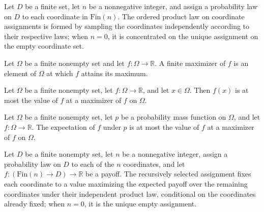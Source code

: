 \begin{definition}
\label{FABL.orderedProductPMF}
\leanok
Let $D$ be a finite set, let $n$ be a nonnegative integer, and assign a probability law
on $D$ to each coordinate in $\mathrm{Fin}(n)$. The ordered product law on coordinate
assignments is formed by sampling the coordinates independently according to their
respective laws; when $n=0$, it is concentrated on the unique assignment on the empty
coordinate set.
\end{definition}

\begin{definition}
\label{FABL.finiteMaximizer}
\leanok
Let $\Omega$ be a finite nonempty set and let $f:\Omega\to\mathbb R$. A finite maximizer
of $f$ is an element of $\Omega$ at which $f$ attains its maximum.
\end{definition}

\begin{theorem}
\label{FABL.le_finiteMaximizer}
\leanok
{}
Let $\Omega$ be a finite nonempty set, let $f:\Omega\to\mathbb R$, and let $x\in\Omega$.
Then $f(x)$ is at most the value of $f$ at a maximizer of $f$ on $\Omega$.
\end{theorem}

\begin{theorem}
\label{FABL.pmfExpectation_le_finiteMaximizer}
\leanok
{}
Let $\Omega$ be a finite nonempty set, let $p$ be a probability mass function on
$\Omega$, and let $f:\Omega\to\mathbb{R}$. The expectation of $f$ under $p$ is at most
the value of $f$ at a maximizer of $f$ on $\Omega$.
\end{theorem}

\begin{definition}
\label{FABL.conditionalExpectationAssignment}
\leanok
{}
Let $D$ be a finite nonempty set, let $n$ be a nonnegative integer, assign a probability
law on $D$ to each of the $n$ coordinates, and let $f:(\mathrm{Fin}(n)\to D)\to\mathbb{R}$ be a payoff. The recursively selected assignment fixes each coordinate to a value maximizing
the expected payoff over the remaining coordinates under their independent product law,
conditional on the coordinates already fixed; when $n=0$, it is the unique empty
assignment.
\end{definition}

